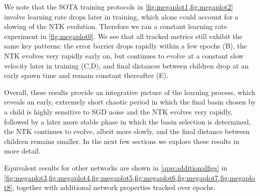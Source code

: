 \documentclass{article}
\begin{document}
We note that the SOTA training protocols in \cref{fig:megaplot1,fig:megaplot2} involve learning rate drops later in training, which alone could account for a slowing of the NTK evolution. Therefore we ran a constant learning rate experiment in \cref{fig:megaplot0}. We see that all tracked metrics still exhibit the same key patterns: the error barrier drops rapidly within a few epochs (B), the NTK evolves very rapidly early on, but continues to evolve at a constant slow velocity later in training (C,D), and final distances between children drop at an early spawn time and remain constant thereafter (E).  

Overall, these results provide an integrative picture of the learning process, which reveals an early, extremely short chaotic period in which the final basin chosen by a child is highly sensitive to SGD noise and the NTK evolves very rapidly, followed by a later more stable phase in which the basin selection is determined, the NTK continues to evolve, albeit more slowly, and the final distance between children remains smaller.  In the next few sections we explore these results in more detail.

Equivalent results for other networks are shown in \cref{app:additionalfigs} in \cref{fig:megaplot3,fig:megaplot4,fig:megaplot5,fig:megaplot6,fig:megaplot7,fig:megaplot8}, together with additional network properties tracked over epochs.


\vspace{-0.3cm}
\end{document}
